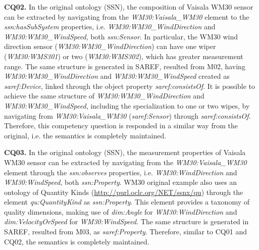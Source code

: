 \documentclass{sig-alternate-05-2015}
\begin{document}
\textbf{CQ02.} In the original ontology (SSN), the composition of Vaisala WM30 sensor can be extracted by navigating from the \textit{WM30:Vaisala\_WM30} element to the \textit{ssn:hasSubSystem} properties, i.e. \textit{WM30:WM30\_WindDirection} and \textit{WM30:WM30\_WindSpeed}, both \textit{ssn:Sensor}. In particular, the WM30 wind direction sensor (\textit{WM30:WM30\_WindDirection}) can have one wiper (\textit{WM30:WMS301}) or two (\textit{WM30:WMS302}), which has greater measurement range. The same structure is generated in SAREF, resulted from M02, having \textit{WM30:WM30\_WindDirection} and \textit{WM30:WM30\_WindSpeed} created as \textit{saref:Device}, linked through the object property \textit{saref:consistsOf}. It is possible to achieve the same structure of \textit{WM30:WM30\_WindDirection} and \textit{WM30:WM30\_WindSpeed}, including the specialization to one or two wipes, by navigating from \textit{WM30:Vaisala\_WM30} (\textit{saref:Sensor}) through \textit{saref:consistsOf}. Therefore, this competency question is responded in a similar way from the original, i.e. the semantics is completely maintained.

\textbf{CQ03.} In the original ontology (SSN), the measurement properties of Vaisala WM30 sensor can be extracted by navigating from the \textit{WM30:Vaisala\_WM30} element through the \textit{ssn:observes} properties, i.e. \textit{WM30:WindDirection} and \textit{WM30:WindSpeed}, both \textit{ssn:Property}. WM30 original example also uses an ontology of Quantity Kinds (\url{http://purl.oclc.org/NET/ssnx/qu}) through the element \textit{qu:QuantityKind} as \textit{ssn:Property}. This element provides a taxonomy of quality dimensions, making use of \textit{dim:Angle} for \textit{WM30:WindDirection} and \textit{dim:VelocityOrSpeed} for \textit{WM30:WindSpeed}. The same structure is generated in SAREF, resulted from M03, as \textit{saref:Property}. Therefore, similar to CQ01 and CQ02, the semantics is completely maintained.
\end{document}
